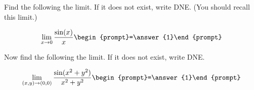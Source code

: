\documentclass{ximera}
\author{David Guichard \and Neal Koblitz \and H. Jerome Keisler \and Albert Scheller \and Barry Balof \and Mike Wills \and Matthew Carr}
\begin{document}
\begin{exercise}




Find the following the limit. If it does not exist, write DNE. (You should recall this limit.)

\[
\lim_{x\to 0}\frac{\sin(x)}{x}\begin{prompt}=\answer{1}\end{prompt}
\]

Now find the following the limit. If it does not exist, write DNE. 

\[
\lim_{(x,y)\to(0,0)}\frac{\sin(x^2+y^2)}{x^2+y^2}\begin{prompt}=\answer{1}\end{prompt}
\]

\end{exercise}
\end{document}
